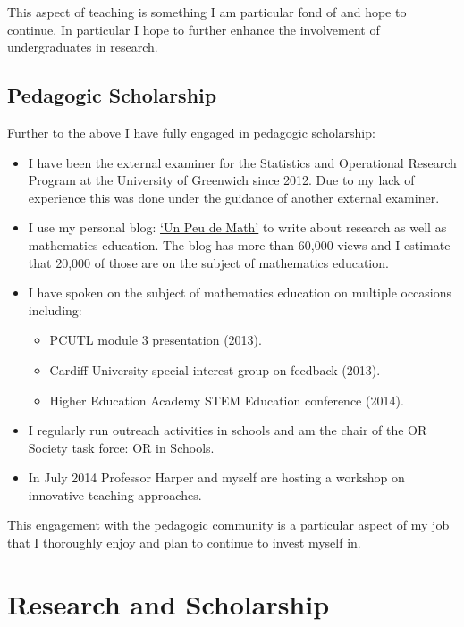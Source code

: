\documentclass{article}
\begin{document}
This aspect of teaching is something I am particular fond of and hope to continue.
In particular I hope to further enhance the involvement of undergraduates in research.

\subsection{Pedagogic Scholarship}

Further to the above I have fully engaged in pedagogic scholarship:

\begin{itemize}
    \item I have been the external examiner for the Statistics and Operational Research Program at the University of Greenwich since 2012. Due to my lack of experience this was done under the guidance of another external examiner.
    \item {I use my personal blog: \href{http://drvinceknight.blogspot.co.uk/}{`Un Peu de Math'} to write about research as well as mathematics education.
    The blog has more than 60,000 views and I estimate that 20,000 of those are on the subject of mathematics education.}
    \item I have spoken on the subject of mathematics education on multiple occasions including:
        \begin{itemize}
            \item PCUTL module 3 presentation (2013).
            \item Cardiff University special interest group on feedback (2013).
            \item Higher Education Academy STEM Education conference (2014).
        \end{itemize}
    \item I regularly run outreach activities in schools and am the chair of the OR Society task force: OR in Schools.
    \item In July 2014 Professor Harper and myself are hosting a workshop on innovative teaching approaches.
\end{itemize}

This engagement with the pedagogic community is a particular aspect of my job that I thoroughly enjoy and plan to continue to invest myself in.

\section{Research and Scholarship}\label{sec:research}
\end{document}
